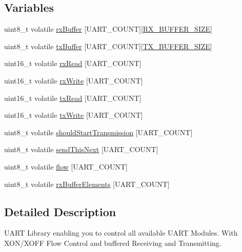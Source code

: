 \subsection*{Variables}
\begin{DoxyCompactItemize}
\item 
uint8\+\_\+t volatile \hyperlink{group__uart_gab7018b7927b8cccfbae6f9aaa0568004}{rx\+Buffer} \mbox{[}U\+A\+R\+T\+\_\+\+C\+O\+U\+N\+T\mbox{]}\mbox{[}\hyperlink{group__uart_ga739a2a1a0047c98ac1b18ecd25dac092}{R\+X\+\_\+\+B\+U\+F\+F\+E\+R\+\_\+\+S\+I\+Z\+E}\mbox{]}
\item 
uint8\+\_\+t volatile \hyperlink{group__uart_ga7f4d2b5ef19fd7e6d9a75757f290c68f}{tx\+Buffer} \mbox{[}U\+A\+R\+T\+\_\+\+C\+O\+U\+N\+T\mbox{]}\mbox{[}\hyperlink{group__uart_ga9ab33647617098646990fe263600b650}{T\+X\+\_\+\+B\+U\+F\+F\+E\+R\+\_\+\+S\+I\+Z\+E}\mbox{]}
\item 
uint16\+\_\+t volatile \hyperlink{group__uart_ga0f60a5b7ebf2fe97d44ceeada8b42007}{rx\+Read} \mbox{[}U\+A\+R\+T\+\_\+\+C\+O\+U\+N\+T\mbox{]}
\item 
uint16\+\_\+t volatile \hyperlink{group__uart_ga1cdf2c2d0be76d213e71977232b2fbac}{rx\+Write} \mbox{[}U\+A\+R\+T\+\_\+\+C\+O\+U\+N\+T\mbox{]}
\item 
uint16\+\_\+t volatile \hyperlink{group__uart_ga9da1183eed5d114e277463b1313454d6}{tx\+Read} \mbox{[}U\+A\+R\+T\+\_\+\+C\+O\+U\+N\+T\mbox{]}
\item 
uint16\+\_\+t volatile \hyperlink{group__uart_ga51f11860503e517cd61cfcd7a4c960eb}{tx\+Write} \mbox{[}U\+A\+R\+T\+\_\+\+C\+O\+U\+N\+T\mbox{]}
\item 
uint8\+\_\+t volatile \hyperlink{group__uart_ga156a853afd97bd4938e2f98d5960ffc2}{should\+Start\+Transmission} \mbox{[}U\+A\+R\+T\+\_\+\+C\+O\+U\+N\+T\mbox{]}
\item 
uint8\+\_\+t volatile \hyperlink{group__uart_gaa1a502a415b55c96a957f18c7c52be21}{send\+This\+Next} \mbox{[}U\+A\+R\+T\+\_\+\+C\+O\+U\+N\+T\mbox{]}
\item 
uint8\+\_\+t volatile \hyperlink{group__uart_ga32736da4f1f69aab6da0d54da60baf4f}{flow} \mbox{[}U\+A\+R\+T\+\_\+\+C\+O\+U\+N\+T\mbox{]}
\item 
uint8\+\_\+t volatile \hyperlink{group__uart_ga06e68070e3b56c88cd70d1da68ec05b3}{rx\+Buffer\+Elements} \mbox{[}U\+A\+R\+T\+\_\+\+C\+O\+U\+N\+T\mbox{]}
\end{DoxyCompactItemize}


\subsection{Detailed Description}
U\+A\+R\+T Library enabling you to control all available U\+A\+R\+T Modules. With X\+O\+N/\+X\+O\+F\+F Flow Control and buffered Receiving and Transmitting. 

